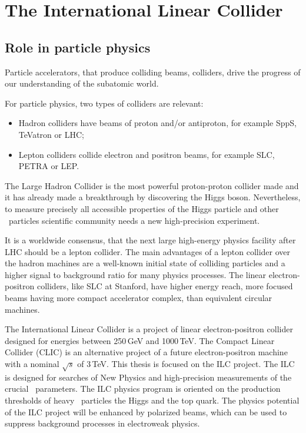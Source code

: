 
\section{The International Linear Collider}
\label{sec:ILC}
\subsection{Role in particle physics}
Particle accelerators, that produce colliding beams, colliders, drive the progress of our understanding of the subatomic world.

For particle physics, two types of colliders are relevant:
\begin{itemize}
\item Hadron colliders have beams of proton and/or antiproton, for example SppS, TeVatron or LHC;
\item Lepton colliders collide electron and positron beams, for example SLC, PETRA or LEP.
\end{itemize}


The Large Hadron Collider is the most powerful proton-proton collider made and it has already made a breakthrough by discovering the Higgs boson.  Nevertheless, to measure precisely all accessible properties of the Higgs particle and other \sm\ particles scientific community needs a new high-precision experiment.

It is a worldwide consensus, that the next large high-energy physics facility after LHC should be a lepton collider. 
The main advantages of a lepton collider over the hadron machines are a well-known initial state of colliding particles and a higher signal to background ratio for many physics processes.
The linear electron-positron colliders, like SLC at Stanford, have higher energy reach, more focused beams having more compact accelerator complex, than equivalent circular machines.

The International Linear Collider is a project of linear electron-positron collider designed for energies between 250\,GeV and 1000\,TeV. 
The Compact Linear Collider (CLIC) is an alternative project of a future electron-positron machine with a nominal $\sqrt s$ of 3\,TeV. 
This thesis is focused on the ILC project.
The ILC is designed for searches of New Physics and high-precision measurements of the crucial \sm\  parameters. 
The ILC physics program is oriented on the production thresholds of heavy \sm\ particles the Higgs and the top quark. 
The physics potential of the ILC project will be enhanced by polarized beams, which can be used to suppress background processes in electroweak physics. 


